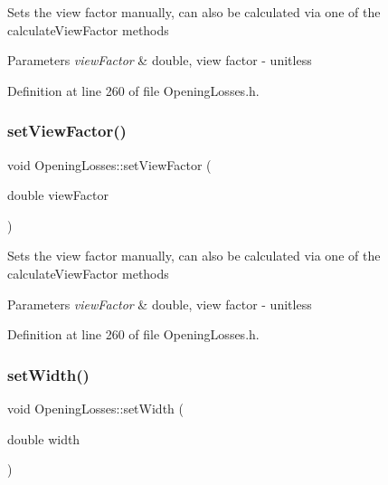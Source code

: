 Sets the view factor manually, can also be calculated via one of the calculate\+View\+Factor methods 
\begin{DoxyParams}{Parameters}
{\em view\+Factor} & double, view factor -\/ unitless \\
\hline
\end{DoxyParams}


Definition at line 260 of file Opening\+Losses.\+h.

\mbox{\label{class_opening_losses_a4e6c6f1549e01cd4b82b7505e403d643}} 
\subsubsection{\texorpdfstring{set\+View\+Factor()}{setViewFactor()}\hspace{0.1cm}{\footnotesize\ttfamily [3/3]}}
{\footnotesize\ttfamily void Opening\+Losses\+::set\+View\+Factor (\begin{DoxyParamCaption}\item[{double}]{view\+Factor }\end{DoxyParamCaption})\hspace{0.3cm}{\ttfamily [inline]}}

Sets the view factor manually, can also be calculated via one of the calculate\+View\+Factor methods 
\begin{DoxyParams}{Parameters}
{\em view\+Factor} & double, view factor -\/ unitless \\
\hline
\end{DoxyParams}


Definition at line 260 of file Opening\+Losses.\+h.

\mbox{\label{class_opening_losses_a5ee8c514917c16ecd2c63caecc98e1c6}} 
\subsubsection{\texorpdfstring{set\+Width()}{setWidth()}\hspace{0.1cm}{\footnotesize\ttfamily [1/3]}}
{\footnotesize\ttfamily void Opening\+Losses\+::set\+Width (\begin{DoxyParamCaption}\item[{double}]{width }\end{DoxyParamCaption})\hspace{0.3cm}{\ttfamily [inline]}}

